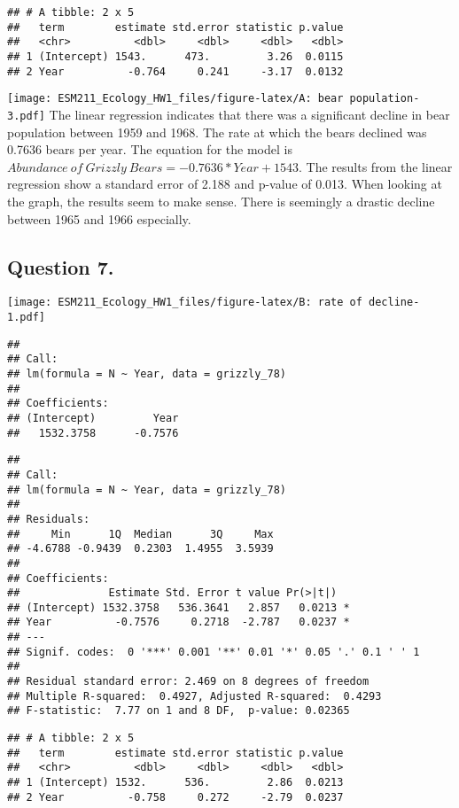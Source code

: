 \documentclass[]{article}
\begin{document}
\begin{verbatim}
## # A tibble: 2 x 5
##   term        estimate std.error statistic p.value
##   <chr>          <dbl>     <dbl>     <dbl>   <dbl>
## 1 (Intercept) 1543.      473.         3.26  0.0115
## 2 Year          -0.764     0.241     -3.17  0.0132
\end{verbatim}

\texttt{[image: ESM211\_Ecology\_HW1\_files/figure-latex/A: bear population-3.pdf]}
The linear regression indicates that there was a significant decline in
bear population between 1959 and 1968. The rate at which the bears
declined was 0.7636 bears per year. The equation for the model is
\(Abundance~of~Grizzly~Bears = -0.7636*Year + 1543\). The results from
the linear regression show a standard error of 2.188 and p-value of
0.013. When looking at the graph, the results seem to make sense. There
is seemingly a drastic decline between 1965 and 1966 especially.

\hypertarget{question-7.}{%
\subsection{Question 7.}\label{question-7.}}

\texttt{[image: ESM211\_Ecology\_HW1\_files/figure-latex/B: rate of decline-1.pdf]}

\begin{verbatim}
## 
## Call:
## lm(formula = N ~ Year, data = grizzly_78)
## 
## Coefficients:
## (Intercept)         Year  
##   1532.3758      -0.7576
\end{verbatim}

\begin{verbatim}
## 
## Call:
## lm(formula = N ~ Year, data = grizzly_78)
## 
## Residuals:
##     Min      1Q  Median      3Q     Max 
## -4.6788 -0.9439  0.2303  1.4955  3.5939 
## 
## Coefficients:
##              Estimate Std. Error t value Pr(>|t|)  
## (Intercept) 1532.3758   536.3641   2.857   0.0213 *
## Year          -0.7576     0.2718  -2.787   0.0237 *
## ---
## Signif. codes:  0 '***' 0.001 '**' 0.01 '*' 0.05 '.' 0.1 ' ' 1
## 
## Residual standard error: 2.469 on 8 degrees of freedom
## Multiple R-squared:  0.4927, Adjusted R-squared:  0.4293 
## F-statistic:  7.77 on 1 and 8 DF,  p-value: 0.02365
\end{verbatim}

\begin{verbatim}
## # A tibble: 2 x 5
##   term        estimate std.error statistic p.value
##   <chr>          <dbl>     <dbl>     <dbl>   <dbl>
## 1 (Intercept) 1532.      536.         2.86  0.0213
## 2 Year          -0.758     0.272     -2.79  0.0237
\end{verbatim}
\end{document}

